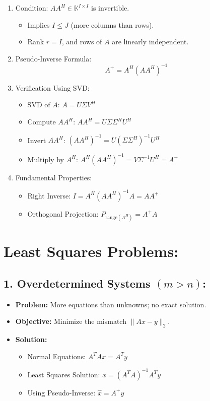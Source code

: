 \documentclass{article}
\begin{document}
\begin{enumerate}
    \item Condition: $AA^H \in \mathbb{K}^{I \times I}$ is invertible.
    \begin{itemize}
        \item Implies $I \leq J$ (more columns than rows).
        \item Rank $r = I$, and rows of $A$ are linearly independent.
    \end{itemize}
    
    \item Pseudo-Inverse Formula:
    \[
    A^+ = A^H(AA^H)^{-1}
    \]

    \item Verification Using SVD:
    \begin{itemize}
        \item SVD of $A$: $A = U \Sigma V^H$
        \item Compute $AA^H$: $AA^H = U \Sigma \Sigma^H U^H$
        \item Invert $AA^H$: $(AA^H)^{-1} = U(\Sigma \Sigma^H)^{-1}U^H$
        \item Multiply by $A^H$: $A^H(AA^H)^{-1} = V \Sigma^{-1} U^H = A^+$
    \end{itemize}
    
    \item Fundamental Properties:
    \begin{itemize}
        \item Right Inverse: $I = A^H(AA^H)^{-1} A = AA^+$
        \item Orthogonal Projection: $P_{\text{range}(A^H)} = A^+ A$
    \end{itemize}
\end{enumerate}


\section*{Least Squares Problems:}

\subsection*{1. Overdetermined Systems $(m > n)$:}

\begin{itemize}
    \item \textbf{Problem:} More equations than unknowns; no exact solution.
    \item \textbf{Objective:} Minimize the mismatch $\|Ax - y\|_2$.
    \item \textbf{Solution:}
    \begin{itemize}
        \item Normal Equations: $A^TAx = A^Ty$
        \item Least Squares Solution: $x = (A^TA)^{-1}A^Ty$
        \item Using Pseudo-Inverse: $\hat{x} = A^+y$
    \end{itemize}
\end{itemize}
\end{document}
